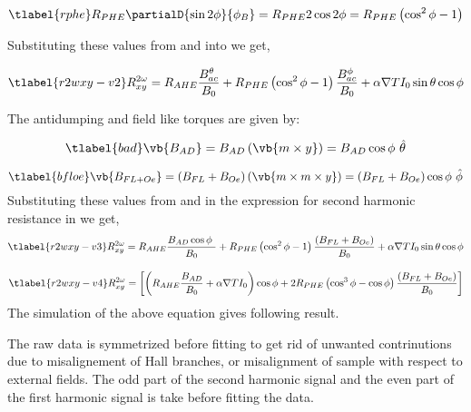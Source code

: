 \begin{equation}
    \tlabel{rphe}
    R_{PHE} \partialD{\sin{2\phi}}{\phi_B} = R_{PHE} 2 \cos{2 \phi} =
    R_{PHE} \left( \cos^{2}{\phi} - 1 \right) 
\end{equation}

Substituting these values from  and  into  
we get,

\begin{equation}
    \tlabel{r2wxy-v2}
    R^{2 \omega}_{xy}  = R_{AHE} \frac{B^{\theta}_{ac}}{B_{0}} 
    + R_{PHE} \left( \cos^{2}{\phi} - 1 \right) \frac{B^{\phi}_{ac}}{B_{0}}
    + \alpha \nabla {T} I_{0} \sin{\theta} \cos{\phi}
\end{equation}

The antidumping and field like torques are given by:

\begin{equation}
    \tlabel{bad}
    \vb{B_{AD}} = B_{AD} \left( \vb{m \times y} \right)
    = B_{AD} \cos{\phi}\ \hat{\theta}
\end{equation}

\begin{equation}
    \tlabel{bfloe}
    \vb{B_{FL+Oe}} = \left( B_{FL} + B_{Oe} \right) \left( \vb{m \times m \times y} \right)
    = \left( B_{FL} + B_{Oe} \right) \cos {\phi}\ \hat{\phi}
\end{equation}
Substituting these values from  and  in the expression 
for second harmonic resistance in  we get,
\begin{equation}
    \tlabel{r2wxy-v3}
    R^{2 \omega}_{xy}  = R_{AHE} \frac{B_{AD} \cos{\phi}\ }{B_{0}} 
    + R_{PHE} \left( \cos^{2}{\phi} - 1 \right) \frac{ \left( B_{FL} + B_{Oe} \right) }{B_{0}}
    + \alpha \nabla {T} I_{0} \sin{\theta} \cos{\phi}
\end{equation}

\begin{equation}
    \tlabel{r2wxy-v4}
    R^{2 \omega}_{xy}  = \left[ \left( R_{AHE} \frac{B_{AD}}{B_{0}} + 
    \alpha \nabla {T} I_{0} \right) \cos{\phi} \\
    + 2 R_{PHE} \left( \cos^{3}{\phi} - \cos{\phi} \right) 
    \frac{ \left( B_{FL} + B_{Oe} \right) }{B_{0}}  \right]    
\end{equation}
The simulation of the above equation gives following result.

The raw data is symmetrized before fitting to get rid of unwanted contrinutions 
due to misalignement of Hall branches, or misalignment of sample with respect 
to external fields. The odd part of the second harmonic signal and the even
part of the first harmonic signal is take before fitting the data.
